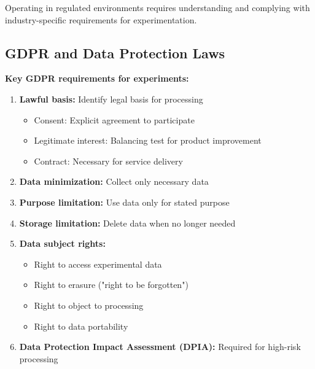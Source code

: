 Operating in regulated environments requires understanding and complying with industry-specific requirements for experimentation.

\subsection{GDPR and Data Protection Laws}

\textbf{Key GDPR requirements for experiments:}

\begin{enumerate}
    \item \textbf{Lawful basis:} Identify legal basis for processing
    \begin{itemize}
        \item Consent: Explicit agreement to participate
        \item Legitimate interest: Balancing test for product improvement
        \item Contract: Necessary for service delivery
    \end{itemize}

    \item \textbf{Data minimization:} Collect only necessary data

    \item \textbf{Purpose limitation:} Use data only for stated purpose

    \item \textbf{Storage limitation:} Delete data when no longer needed

    \item \textbf{Data subject rights:}
    \begin{itemize}
        \item Right to access experimental data
        \item Right to erasure ("right to be forgotten")
        \item Right to object to processing
        \item Right to data portability
    \end{itemize}

    \item \textbf{Data Protection Impact Assessment (DPIA):} Required for high-risk processing
\end{enumerate}


